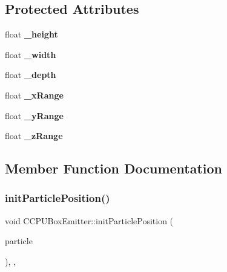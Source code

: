 \subsection*{Protected Attributes}
\begin{DoxyCompactItemize}
\item 
\mbox{\label{classCCPUBoxEmitter_a9dc52df1f4a3779d1eeb9afa207896db}} 
float {\bfseries \+\_\+height}
\item 
\mbox{\label{classCCPUBoxEmitter_af59f8a2764c9e6d41d398532d3cce9c9}} 
float {\bfseries \+\_\+width}
\item 
\mbox{\label{classCCPUBoxEmitter_ab14ecd18f4c377959ef082d17e73975d}} 
float {\bfseries \+\_\+depth}
\item 
\mbox{\label{classCCPUBoxEmitter_a606fe04b0c2a5a36e6eafc59f01c5a4d}} 
float {\bfseries \+\_\+x\+Range}
\item 
\mbox{\label{classCCPUBoxEmitter_a8f1d7d5d88a8fdfef94a13c78c03ffd7}} 
float {\bfseries \+\_\+y\+Range}
\item 
\mbox{\label{classCCPUBoxEmitter_af53b963dbf473f4dc7029a3e04d87449}} 
float {\bfseries \+\_\+z\+Range}
\end{DoxyCompactItemize}


\subsection{Member Function Documentation}
\mbox{\label{classCCPUBoxEmitter_ad3f50a904d4f27ce0b40d5e9ccfad9c9}} 
\subsubsection{\texorpdfstring{init\+Particle\+Position()}{initParticlePosition()}\hspace{0.1cm}{\footnotesize\ttfamily [1/2]}}
{\footnotesize\ttfamily void C\+C\+P\+U\+Box\+Emitter\+::init\+Particle\+Position (\begin{DoxyParamCaption}\item[{\hyperlink{structPUParticle3D}{P\+U\+Particle3D} $\ast$}]{particle }\end{DoxyParamCaption})\hspace{0.3cm}{\ttfamily [override]}, {\ttfamily [protected]}, {\ttfamily [virtual]}}

